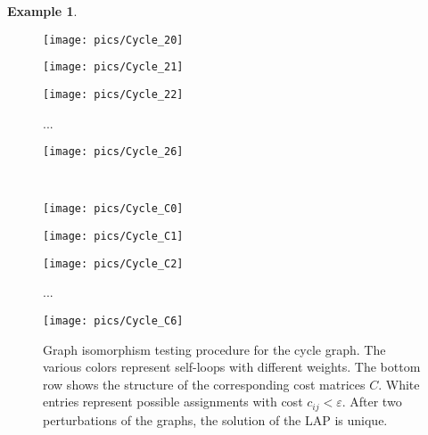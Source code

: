 \documentclass
[
    a4paper,
    DIV=11,
    abstracton
]
{scrartcl}
\theoremstyle{definition}
\newtheorem{example}[theorem]{Example}
\begin{document}
\begin{example}
\begin{enumerate}[leftmargin=0em,itemindent=1.7em,labelsep=0.3em,label=\roman*)]
\begin{figure}[htb]
    \begin{minipage}[c]{0.23\textwidth}
        \centering
        \texttt{[image: pics/Cycle\_20]}
    \end{minipage}
    \begin{minipage}[c]{0.23\textwidth}
        \centering
        \texttt{[image: pics/Cycle\_21]}
    \end{minipage}
    \begin{minipage}[c]{0.23\textwidth}
        \centering
        \texttt{[image: pics/Cycle\_22]}
    \end{minipage}
    \begin{minipage}[c]{0.03\textwidth}
        ...
    \end{minipage}
    \begin{minipage}[c]{0.23\textwidth}
        \centering
        \texttt{[image: pics/Cycle\_26]}
    \end{minipage} \\[1.5ex]
    
    \begin{minipage}[c]{0.23\textwidth}
        \centering
        \texttt{[image: pics/Cycle\_C0]}
    \end{minipage}
    \begin{minipage}[c]{0.23\textwidth}
        \centering
        \texttt{[image: pics/Cycle\_C1]}
    \end{minipage}
    \begin{minipage}[c]{0.23\textwidth}
        \centering
        \texttt{[image: pics/Cycle\_C2]}
    \end{minipage}
    \begin{minipage}[c]{0.03\textwidth}
        ...
    \end{minipage}
    \begin{minipage}[c]{0.23\textwidth}
        \centering
        \texttt{[image: pics/Cycle\_C6]}
    \end{minipage}   
    \caption{Graph isomorphism testing procedure for the cycle graph. The various colors represent self-loops with different weights. The bottom row shows the structure of the corresponding cost matrices $ C $. White entries represent possible assignments with cost $ c_{ij} < \varepsilon $. After two perturbations of the graphs, the solution of the LAP is unique.}
    \label{fig:Cycle graph}
\end{figure}


\end{enumerate}
\end{example}
\end{document}

